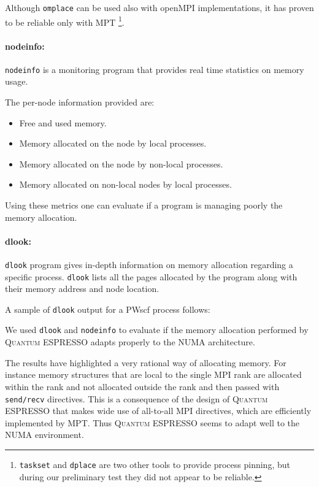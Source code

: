 \documentclass[a4paper,12pt]{article}
\newcommand\QE{\textsc{Quantum} ESPRESSO }
\begin{document}
Although \texttt{omplace} can be used also with openMPI implementations, it has proven to be reliable only with MPT
\footnote{\texttt{taskset} and \texttt{dplace} are two other tools to provide process pinning, but during our preliminary test they did not appear to be reliable.}.

\paragraph{nodeinfo:}\texttt{nodeinfo} is a monitoring program that provides real time statistics on memory usage.

The per-node information provided are:
\begin{itemize}
	\item Free and used memory.
	\item Memory allocated on the node by local processes.
	\item Memory allocated on the node by non-local processes.
	\item Memory allocated on non-local nodes by local processes.
\end{itemize}

Using these metrics one can evaluate if a program is managing poorly the memory allocation.

\paragraph{dlook:} \texttt{dlook} program gives in-depth information on memory allocation regarding a specific process.
\texttt{dlook} lists all the pages allocated by the program along with their memory address and node location.

A sample of \texttt{dlook} output for a PWscf process follows:



We used \texttt{dlook} and \texttt{nodeinfo} to evaluate if the memory allocation performed by \QE adapts properly to the NUMA architecture.

The results have highlighted a very rational way of allocating memory.
For instance memory structures that are local to the single MPI rank are allocated within the rank and not allocated outside the rank and then passed with \texttt{send/recv} directives.
This is a consequence of the design of \QE that makes wide use of all-to-all MPI directives, which are efficiently implemented by MPT.
Thus \QE seems to adapt well to the NUMA environment.
\end{document}
